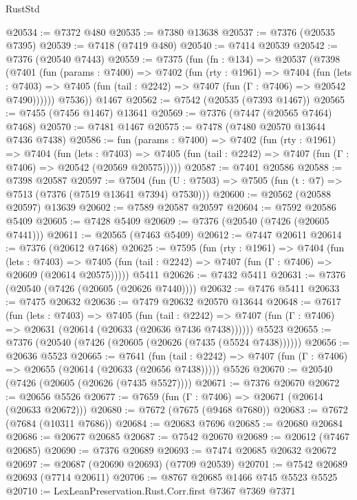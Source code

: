 \begin{lexlean}{RustStd}
\begin{coremodule}
@20534 := @7372 @480
@20535 := @7380 @13638
@20537 := @7376 (@20535 @7395)
@20539 := @7418 (@7419 @480)
@20540 := @7414 @20539
@20542 := @7376 (@20540 @7443)
@20559 := @7375
    (fun (fn : @134) =>
    @20537
      (@7398
        (@7401
          (fun (params : @7400) =>
          @7402
            (fun (rty : @1961) =>
            @7404
              (fun (lets : @7403) =>
              @7405 (fun (tail : @2242) => @7407 (fun (Γ : @7406) => @20542 @7490))))))
        @7536))
    @1467
@20562 := @7542 (@20535 (@7393 @1467))
@20565 := @7455 (@7456 @1467) @13641
@20569 := @7376 (@7447 (@20565 @7464) @7468)
@20570 := @7481 @1467
@20575 := @7478 (@7480 @20570 @13644 @7436 @7438)
@20586 := fun (params : @7400) =>
  @7402
    (fun (rty : @1961) =>
    @7404
      (fun (lets : @7403) =>
      @7405 (fun (tail : @2242) => @7407 (fun (Γ : @7406) => @20542 (@20569 @20575)))))
@20587 := @7401 @20586
@20588 := @7398 @20587
@20597 := @7504
    (fun (U : @7503) => @7505 (fun (t : @7) => @7513 (@7376 (@7519 @13641 @7394) @7530)))
@20600 := @20562 (@20588 @20597) @13639
@20602 := @7589 @20587 @20597
@20604 := @7592 @20586 @5409
@20605 := @7428 @5409
@20609 := @7376 (@20540 (@7426 (@20605 @7441)))
@20611 := @20565 (@7463 @5409)
@20612 := @7447 @20611
@20614 := @7376 (@20612 @7468)
@20625 := @7595
    (fun (rty : @1961) =>
    @7404
      (fun (lets : @7403) =>
      @7405 (fun (tail : @2242) => @7407 (fun (Γ : @7406) => @20609 (@20614 @20575)))))
    @5411
@20626 := @7432 @5411
@20631 := @7376 (@20540 (@7426 (@20605 (@20626 @7440))))
@20632 := @7476 @5411
@20633 := @7475 @20632
@20636 := @7479 @20632 @20570 @13644
@20648 := @7617
    (fun (lets : @7403) =>
    @7405
      (fun (tail : @2242) =>
      @7407 (fun (Γ : @7406) => @20631 (@20614 (@20633 (@20636 @7436 @7438))))))
    @5523
@20655 := @7376 (@20540 (@7426 (@20605 (@20626 (@7435 (@5524 @7438))))))
@20656 := @20636 @5523
@20665 := @7641
    (fun (tail : @2242) => @7407 (fun (Γ : @7406) => @20655 (@20614 (@20633 (@20656 @7438)))))
    @5526
@20670 := @20540 (@7426 (@20605 (@20626 (@7435 @5527))))
@20671 := @7376 @20670
@20672 := @20656 @5526
@20677 := @7659 (fun (Γ : @7406) => @20671 (@20614 (@20633 @20672)))
@20680 := @7672 (@7675 (@9468 @7680))
@20683 := @7672 (@7684 (@10311 @7686))
@20684 := @20683 @7696
@20685 := @20680 @20684
@20686 := @20677 @20685
@20687 := @7542 @20670
@20689 := @20612 (@7467 @20685)
@20690 := @7376 @20689
@20693 := @7474 @20685 @20632 @20672
@20697 := @20687 (@20690 @20693) (@7709 @20539)
@20701 := @7542 @20689 @20693 (@7714 @20611)
@20706 := @8767 @20685 @1466 @745 @5523 @5525
@20710 := LexLeanPreservation.Rust.Corr.first @7367 @7369 @7371

\end{coremodule}
\end{lexlean}
